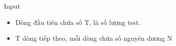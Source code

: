 Input
\begin{itemize}
	\item Dòng đầu tiên chứa số T, là số lượng test.
	\item T dòng tiếp theo, mỗi dòng chứa số nguyên dương N
\end{itemize}